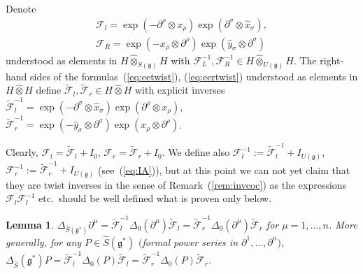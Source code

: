 \documentclass[10pt,a4paper]{amsart}
\def\gg{\mathfrak{g}}
\def\hx{\hat{x}}
\def\hy{\hat{y}}
\newtheorem{Lemma}[Theorem]{Lemma}
\numberwithin{equation}{section}
\begin{document}
\begin{Definition} Denote
\begin{gather}\label{eq:eetwist}
\mathcal{F}_l = \exp(-\partial^\rho\otimes x_\rho)\exp(\partial^\sigma\otimes\hx_\sigma),\\
\label{eq:eertwist}
\mathcal{F}_R = \exp(-x_\rho\otimes\partial^\rho) \exp(\hy_\sigma\otimes\partial^\sigma)
\end{gather}
understood as elements in $H\hat\otimes_{S(\gg)} H$ with $\mathcal{F}^{-1}_L, \mathcal{F}^{-1}_R\in H\hat\otimes_{U(\gg)}H$. The right-hand sides of the formulas~(\ref{eq:eetwist}), (\ref{eq:eertwist}) understood as elements in $H\hat\otimes H$ define $\tilde{\mathcal{F}}_l,\tilde{\mathcal{F}}_r\in H\hat\otimes H$ with explicit inverses $\tilde{\mathcal{F}}_l^{-1} = \exp(-\partial^\sigma\otimes\hx_\sigma)\exp(\partial^\rho\otimes x_\rho)$, $\tilde{\mathcal{F}}_r^{-1} = \exp(-\hy_\sigma\otimes\partial^\sigma)\exp(x_\rho\otimes\partial^\rho)$.
\end{Definition}

Clearly, $\mathcal{F}_l = \tilde{\mathcal{F}}_l+I_0$, $\mathcal{F}_r = \tilde{\mathcal{F}}_r+I_0$. We define also $\mathcal{F}_l^{-1} := \tilde{\mathcal{F}}_l^{-1}+I_{U(\gg)}$, $\mathcal{F}_r^{-1} := \tilde{\mathcal{F}}_r^{-1}+I_{U(\gg)}$ (see~(\ref{eq:IA})), but at this point we can not yet claim that they are twist inverses in the sense of Remark~(\ref{rem:invcoc}) as the expressions $\mathcal{F}_l\mathcal{F}_l^{-1}$ etc.\ should be well defined what is proven only below.

\begin{Lemma}\label{lem:DeltaFd}
$\Delta_{\hat{S}(\gg^*)}\partial^\mu = \tilde{\mathcal{F}}_l^{-1}\Delta_0(\partial^\mu)\tilde{\mathcal{F}}_l = \tilde{\mathcal{F}}_r^{-1}\Delta_0(\partial^\mu)\tilde{\mathcal{F}}_r$ for $\mu = 1,\dots, n$. More generally, for any $P\in\hat{S}(\gg^*)$ $($formal power series in $\partial^1,\dots,\partial^n)$, $\Delta_{\hat{S}}(\gg^*) P = \tilde{\mathcal{F}}_l^{-1}\Delta_0(P)\tilde{\mathcal{F}}_l = \tilde{\mathcal{F}}_r^{-1}\Delta_0(P)\tilde{\mathcal{F}}_r$.
\end{Lemma}
\end{document}
